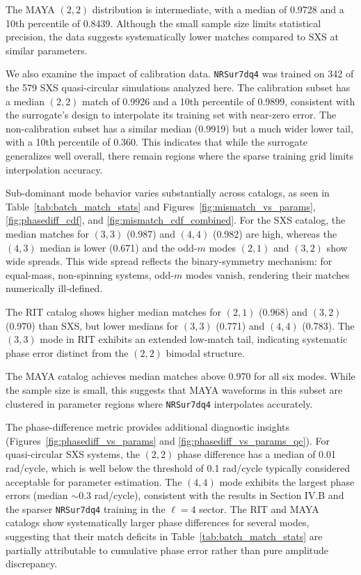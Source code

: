 \documentclass[%
 reprint,
superscriptaddress,
 amsmath,amssymb,
 aps,
]{revtex4-2}
\begin{document}
The MAYA $(2,2)$ distribution is intermediate, with a median of 0.9728 and a 10th percentile of 0.8439. Although the small sample size limits statistical precision, the data suggests systematically lower matches compared to SXS at similar parameters.

We also examine the impact of calibration data. \texttt{NRSur7dq4} was trained on 342 of the 579 SXS quasi-circular simulations analyzed here. The calibration subset has a median $(2,2)$ match of 0.9926 and a 10th percentile of 0.9899, consistent with the surrogate's design to interpolate its training set with near-zero error. The non-calibration subset has a similar median (0.9919) but a much wider lower tail, with a 10th percentile of 0.360. This indicates that while the surrogate generalizes well overall, there remain regions where the sparse training grid limits interpolation accuracy.

Sub-dominant mode behavior varies substantially across catalogs, as seen in Table~\ref{tab:batch_match_stats} and Figures~\ref{fig:mismatch_vs_params}, \ref{fig:phasediff_cdf}, and \ref{fig:mismatch_cdf_combined}. For the SXS catalog, the median matches for $(3,3)$ (0.987) and $(4,4)$ (0.982) are high, whereas the $(4,3)$ median is lower (0.671) and the odd-$m$ modes $(2,1)$ and $(3,2)$ show wide spreads. This wide spread reflects the binary-symmetry mechanism: for equal-mass, non-spinning systems, odd-$m$ modes vanish, rendering their matches numerically ill-defined.

The RIT catalog shows higher median matches for $(2,1)$ (0.968) and $(3,2)$ (0.970) than SXS, but lower medians for $(3,3)$ (0.771) and $(4,4)$ (0.783). The $(3,3)$ mode in RIT exhibits an extended low-match tail, indicating systematic phase error distinct from the $(2,2)$ bimodal structure.

The MAYA catalog achieves median matches above 0.970 for all six modes. While the sample size is small, this suggests that MAYA waveforms in this subset are clustered in parameter regions where \texttt{NRSur7dq4} interpolates accurately.

The phase-difference metric provides additional diagnostic insights (Figures~\ref{fig:phasediff_vs_params} and \ref{fig:phasediff_vs_params_qc}). For quasi-circular SXS systems, the $(2,2)$ phase difference has a median of 0.01 rad/cycle, which is well below the threshold of 0.1 rad/cycle typically considered acceptable for parameter estimation. The $(4,4)$ mode exhibits the largest phase errors (median $\sim$0.3 rad/cycle), consistent with the results in Section IV.B and the sparser \texttt{NRSur7dq4} training in the $\ell = 4$ sector. The RIT and MAYA catalogs show systematically larger phase differences for several modes, suggesting that their match deficits in Table~\ref{tab:batch_match_stats} are partially attributable to cumulative phase error rather than pure amplitude discrepancy.
\end{document}

